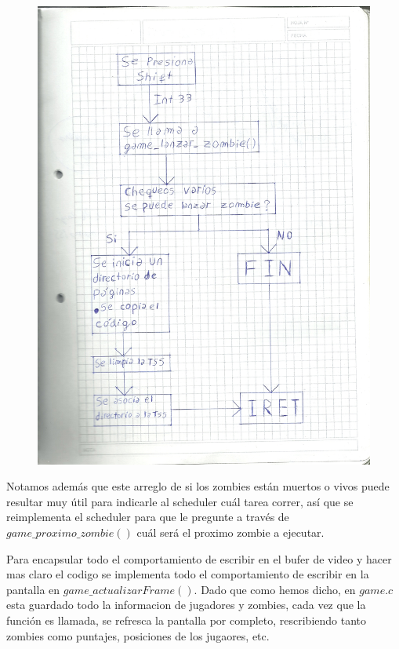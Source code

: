 \documentclass[a4paper]{article}
\begin{document}
\begin{figure}[h!]
  \begin{center}
\includegraphics[scale=0.3]{dibujos/dibujo1.jpg}\\
  \end{center}
\end{figure}

Notamos además que este arreglo de si los zombies están muertos o vivos puede resultar muy útil para indicarle al scheduler cuál tarea correr, así que se reimplementa el scheduler para que le pregunte a través de $game\_ proximo\_ zombie()$ cuál será el proximo zombie a ejecutar.

Para encapsular todo el comportamiento de escribir en el bufer de video y hacer mas claro el codigo se implementa todo el comportamiento de escribir en la pantalla en $game\_actualizarFrame()$. Dado que como hemos dicho, en $game.c$ esta guardado todo la informacion de jugadores y zombies, cada vez que la función es llamada, se refresca la pantalla por completo, rescribiendo tanto zombies como puntajes, posiciones de los jugaores, etc.
\end{document}
